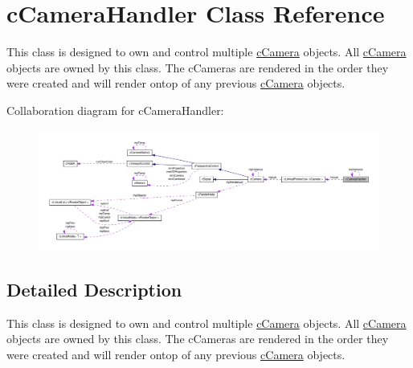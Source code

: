 \hypertarget{classc_camera_handler}{
\section{cCameraHandler Class Reference}
\label{classc_camera_handler}
}


This class is designed to own and control multiple \hyperlink{classc_camera}{cCamera} objects. All \hyperlink{classc_camera}{cCamera} objects are owned by this class. The cCameras are rendered in the order they were created and will render ontop of any previous \hyperlink{classc_camera}{cCamera} objects.  




Collaboration diagram for cCameraHandler:
\nopagebreak
\begin{figure}[H]
\begin{center}
\leavevmode
\includegraphics[width=400pt]{classc_camera_handler__coll__graph}
\end{center}
\end{figure}


\subsection{Detailed Description}
This class is designed to own and control multiple \hyperlink{classc_camera}{cCamera} objects. All \hyperlink{classc_camera}{cCamera} objects are owned by this class. The cCameras are rendered in the order they were created and will render ontop of any previous \hyperlink{classc_camera}{cCamera} objects. 